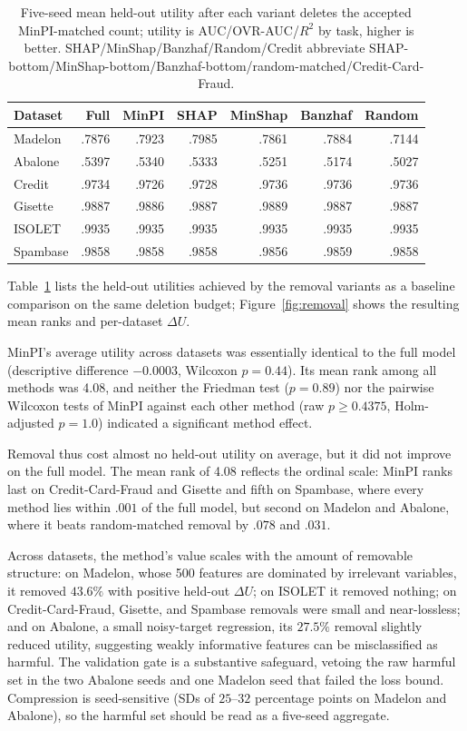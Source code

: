 \documentclass{article}
\begin{document}
\begin{table}[t]
\caption{Five-seed mean held-out utility after each variant deletes the accepted MinPI-matched count; utility is AUC/OVR-AUC/$R^2$ by task, higher is better. SHAP/MinShap/Banzhaf/Random/Credit abbreviate SHAP-bottom/MinShap-bottom/Banzhaf-bottom/random-matched/Credit-Card-Fraud.}
\label{tab:utility}
\centering
\footnotesize
\begin{tabular}{lrrrrrr}
\toprule
Dataset & Full & MinPI & SHAP & MinShap & Banzhaf & Random \\
\midrule
Madelon & .7876 & .7923 & .7985 & .7861 & .7884 & .7144 \\
Abalone & .5397 & .5340 & .5333 & .5251 & .5174 & .5027 \\
Credit & .9734 & .9726 & .9728 & .9736 & .9736 & .9736 \\
Gisette & .9887 & .9886 & .9887 & .9889 & .9887 & .9887 \\
ISOLET & .9935 & .9935 & .9935 & .9935 & .9935 & .9935 \\
Spambase & .9858 & .9858 & .9858 & .9856 & .9859 & .9858 \\
\bottomrule
\end{tabular}
\end{table}

Table~\ref{tab:utility} lists the held-out utilities achieved by the removal variants as a baseline comparison on the same deletion budget; Figure~\ref{fig:removal} shows the resulting mean ranks and per-dataset $\Delta U$.

MinPI's average utility across datasets was essentially identical to the full model (descriptive difference $-0.0003$, Wilcoxon $p = 0.44$). Its mean rank among all methods was 4.08, and neither the Friedman test ($p = 0.89$) nor the pairwise Wilcoxon tests of MinPI against each other method (raw $p \geq 0.4375$, Holm-adjusted $p = 1.0$) indicated a significant method effect.

Removal thus cost almost no held-out utility on average, but it did not improve on the full model. The mean rank of 4.08 reflects the ordinal scale: MinPI ranks last on Credit-Card-Fraud and Gisette and fifth on Spambase, where every method lies within $.001$ of the full model, but second on Madelon and Abalone, where it beats random-matched removal by $.078$ and $.031$.

Across datasets, the method's value scales with the amount of removable structure: on Madelon, whose 500 features are dominated by irrelevant variables, it removed $43.6\%$ with positive held-out $\Delta U$; on ISOLET it removed nothing; on Credit-Card-Fraud, Gisette, and Spambase removals were small and near-lossless; and on Abalone, a small noisy-target regression, its $27.5\%$ removal slightly reduced utility, suggesting weakly informative features can be misclassified as harmful. The validation gate is a substantive safeguard, vetoing the raw harmful set in the two Abalone seeds and one Madelon seed that failed the loss bound. Compression is seed-sensitive (SDs of $25$--$32$ percentage points on Madelon and Abalone), so the harmful set should be read as a five-seed aggregate.
\end{document}

